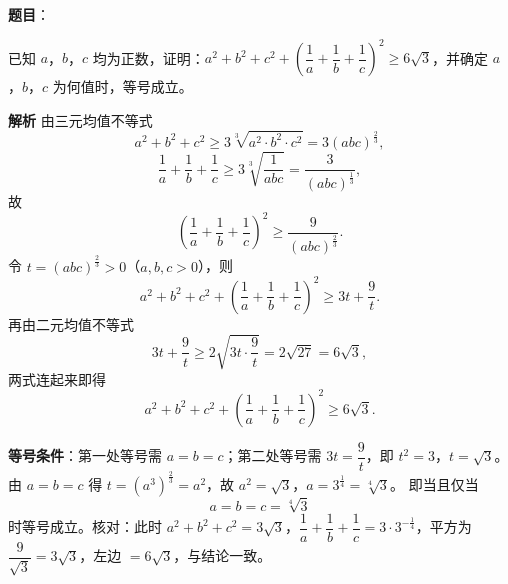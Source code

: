 \begin{answer}

\textbf{题目}：

已知 $a$，$b$，$c$ 均为正数，证明：$a^2+b^2+c^2+\left(\dfrac1a+\dfrac1b+\dfrac1c\right)^2\geqslant6\sqrt3$，并确定 $a$，$b$，$c$ 为何值时，等号成立。

\textbf{解析}
由三元均值不等式
\nopagebreak[4]
\[a^2+b^2+c^2\geqslant3\sqrt[3]{a^2\cdot b^2\cdot c^2}=3(abc)^{\frac23},\]
\nopagebreak[4]
\[\frac1a+\frac1b+\frac1c\geqslant3\sqrt[3]{\frac1{abc}}=\frac{3}{(abc)^{\frac13}},\]
故
\nopagebreak[4]
\[\left(\frac1a+\frac1b+\frac1c\right)^2\geqslant\frac{9}{(abc)^{\frac23}}.\]
令 $t=(abc)^{\frac23}>0$（$a,b,c>0$），则
\nopagebreak[4]
\[a^2+b^2+c^2+\left(\frac1a+\frac1b+\frac1c\right)^2\geqslant3t+\frac9t.\]
再由二元均值不等式
\nopagebreak[4]
\[3t+\frac9t\geqslant2\sqrt{3t\cdot\frac9t}=2\sqrt{27}=6\sqrt3,\]
两式连起来即得
\nopagebreak[4]
\[a^2+b^2+c^2+\left(\frac1a+\frac1b+\frac1c\right)^2\geqslant6\sqrt3.\]

\textbf{等号条件}：第一处等号需 $a=b=c$；第二处等号需 $3t=\dfrac9t$，即 $t^2=3$，$t=\sqrt3$。由 $a=b=c$ 得 $t=(a^3)^{\frac23}=a^2$，故 $a^2=\sqrt3$，$a=3^{\frac14}=\sqrt[4]{3}$。
即当且仅当
\nopagebreak[4]
\[a=b=c=\sqrt[4]{3}\]
时等号成立。核对：此时 $a^2+b^2+c^2=3\sqrt3$，$\dfrac1a+\dfrac1b+\dfrac1c=3\cdot3^{-\frac14}$，平方为 $\dfrac{9}{\sqrt3}=3\sqrt3$，左边 $=6\sqrt3$，与结论一致。


\end{answer}